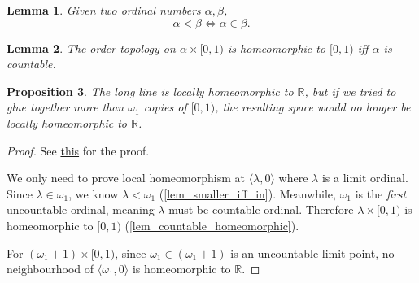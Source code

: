 \documentclass[12pt, letterpaper]{article}
\newcommand{\re}{\mathbb{R}}
\newtheorem{prop}{Proposition}[section]
\newtheorem{lem}[prop]{Lemma}
\theoremstyle{definition}
\theoremstyle{remark}
\theoremstyle{definition}
\theoremstyle{plain}
\numberwithin{equation}{section}
\begin{document}
	\begin{lem}\label{lem_smaller_iff_in}
		Given two ordinal numbers $\alpha, \beta$,
		\[\alpha<\beta\iff\alpha\in\beta.\]
	\end{lem}
	\begin{lem}\label{lem_countable_homeomorphic}
		The order topology on $\alpha\times[0,1)$ is homeomorphic to $[0,1)$
		iff $\alpha$ is countable.
	\end{lem}
	\begin{prop}
		The long line is locally homeomorphic to $\re$, but 
		if we tried to glue together more than $\omega _{1}$ copies of $[0,1)$,
		the resulting space would no longer be locally homeomorphic to $\re$.
	\end{prop}
	\begin{proof}
		See \href{https://math.stackexchange.com/questions/700178/long-ray-proof-of-being-locally-euclidean}
		{this} for the proof.
		
		We only need to prove local homeomorphism at $\langle\lambda,0\rangle$ where $\lambda$ is a limit ordinal.
		Since $\lambda\in\omega_{1}$, we know $\lambda<\omega_{1}$ (\autoref{lem_smaller_iff_in}).
		Meanwhile, $\omega_{1}$ is the \textit{first} uncountable ordinal,
		meaning $\lambda$ must be countable ordinal.
		Therefore $\lambda\times[0,1)$ is homeomorphic to $[0,1)$ (\autoref{lem_countable_homeomorphic}).
		
		For $(\omega_{1}+1)\times[0,1)$, since $\omega_{1}\in(\omega_{1}+1)$ is an uncountable limit point,
		no neighbourhood of $\langle\omega_1,0\rangle$ is homeomorphic to $\re$.
	\end{proof}
\end{document}
